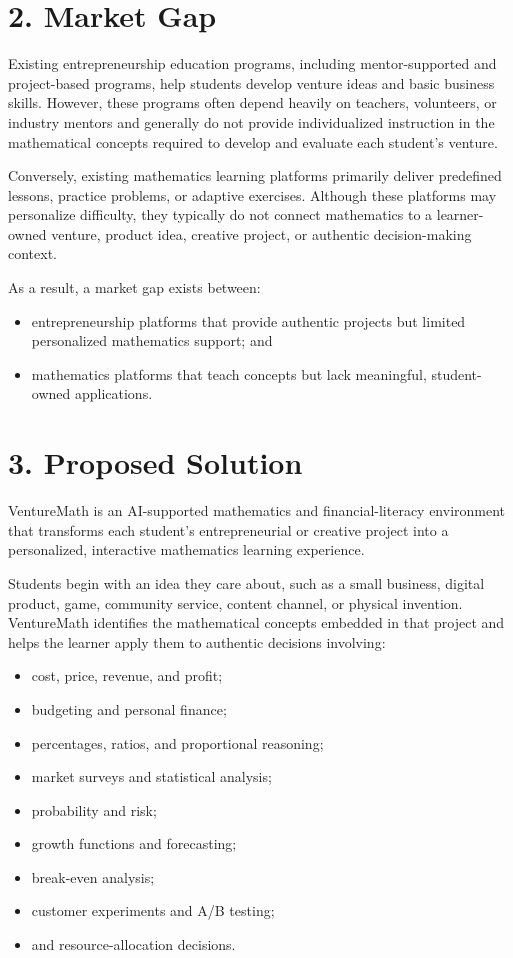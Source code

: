 \section{2. Market Gap}

Existing entrepreneurship education programs, including mentor-supported and project-based programs, help students develop venture ideas and basic business skills. However, these programs often depend heavily on teachers, volunteers, or industry mentors and generally do not provide individualized instruction in the mathematical concepts required to develop and evaluate each student’s venture.

Conversely, existing mathematics learning platforms primarily deliver predefined lessons, practice problems, or adaptive exercises. Although these platforms may personalize difficulty, they typically do not connect mathematics to a learner-owned venture, product idea, creative project, or authentic decision-making context.

As a result, a market gap exists between:
\begin{itemize}
    \item entrepreneurship platforms that provide authentic projects but limited personalized mathematics support; and
    \item mathematics platforms that teach concepts but lack meaningful, student-owned applications.
\end{itemize}

\section{3. Proposed Solution}

VentureMath is an AI-supported mathematics and financial-literacy environment that transforms each student’s entrepreneurial or creative project into a personalized, interactive mathematics learning experience.

Students begin with an idea they care about, such as a small business, digital product, game, community service, content channel, or physical invention. VentureMath identifies the mathematical concepts embedded in that project and helps the learner apply them to authentic decisions involving:
\begin{itemize}
    \item cost, price, revenue, and profit;
\item budgeting and personal finance;
\item percentages, ratios, and proportional reasoning;
\item market surveys and statistical analysis;
\item probability and risk;
\item growth functions and forecasting;
\item break-even analysis;
\item customer experiments and A/B testing;
\item and resource-allocation decisions.
\end{itemize}


